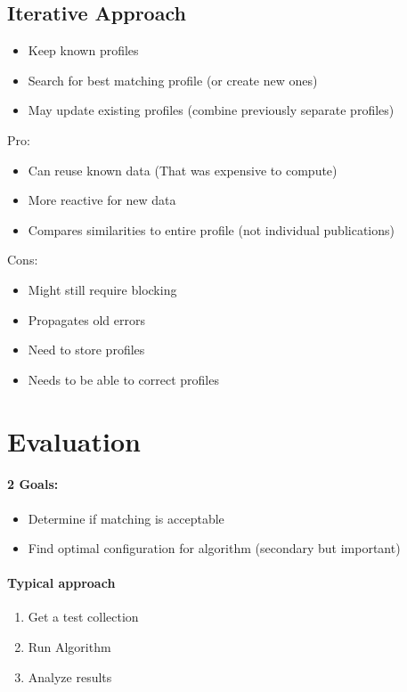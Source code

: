 \documentclass[10pt,a4paper]{scrreprt}
\begin{document}
\subsection{Iterative Approach}
\begin{itemize}
	\item Keep known profiles
	\item Search for best matching profile (or create new ones)
	\item May update existing profiles (combine previously separate profiles)
\end{itemize}
Pro:
\begin{itemize}
	\item Can reuse known data (That was expensive to compute)
	\item More reactive for new data
	\item Compares similarities to entire profile (not individual publications)
\end{itemize}
Cons:
\begin{itemize}
	\item Might still require blocking
	\item Propagates old errors
	\item Need to store profiles
	\item Needs to be able to correct profiles
\end{itemize}

\section{Evaluation}
\paragraph{2 Goals:}
\begin{itemize}
	\item Determine if matching is acceptable
	\item Find optimal configuration for algorithm (secondary but important)
\end{itemize}

\paragraph{Typical approach}
\begin{enumerate}
	\item Get a test collection
	\item Run Algorithm
	\item Analyze results
\end{enumerate}
\end{document}
